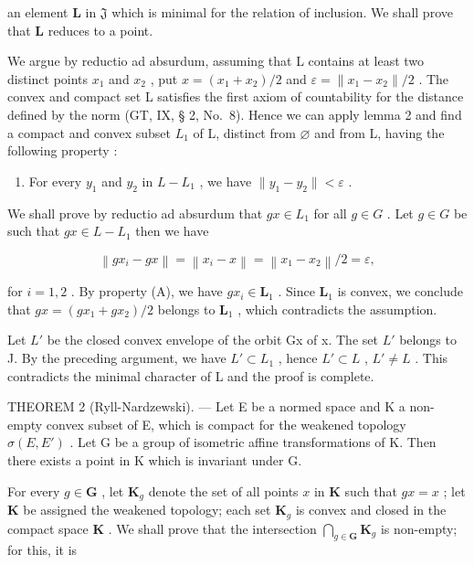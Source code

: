 an element \(\mathbf{L}\) in \(\mathfrak{J}\) which is minimal for the relation of inclusion. We shall prove that \(\mathbf{L}\) reduces to a point.

We argue by reductio ad absurdum, assuming that L contains at least two distinct points \(x_{1}\) and \(x_{2}\) , put \(x = (x_{1} + x_{2})/2\) and \(\varepsilon = \|x_{1} - x_{2}\|/2\) . The convex and compact set L satisfies the first axiom of countability for the distance defined by the norm (GT, IX, § 2, No.~8). Hence we can apply lemma 2 and find a compact and convex subset \(L_{1}\) of L, distinct from \(\varnothing\) and from L, having the following property :

\begin{enumerate}
\def\labelenumi{(\Alph{enumi})}
\tightlist
\item
  For every \(y_{1}\) and \(y_{2}\) in \(L - L_{1}\) , we have \(\|y_{1} - y_{2}\| < \varepsilon\) .
\end{enumerate}

We shall prove by reductio ad absurdum that \(gx \in L_{1}\) for all \(g \in G\) . Let \(g \in G\) be such that \(gx \in L - L_{1}\) then we have

\[
\left\| g x _ {i} - g x \right\| = \left\| x _ {i} - x \right\| = \left\| x _ {1} - x _ {2} \right\| / 2 = \varepsilon ,
\]

for \(i = 1, 2\) . By property (A), we have \(gx_{i} \in \mathbf{L}_{1}\) . Since \(\mathbf{L}_{1}\) is convex, we conclude that \(gx = (gx_{1} + gx_{2}) / 2\) belongs to \(\mathbf{L}_{1}\) , which contradicts the assumption.

Let \(L'\) be the closed convex envelope of the orbit Gx of x. The set \(L'\) belongs to J. By the preceding argument, we have \(L' \subset L_1\) , hence \(L' \subset L\) , \(L' \neq L\) . This contradicts the minimal character of L and the proof is complete.

THEOREM 2 (Ryll-Nardzewski). --- Let E be a normed space and K a non-empty convex subset of E, which is compact for the weakened topology \(\sigma(E, E')\) . Let G be a group of isometric affine transformations of K. Then there exists a point in K which is invariant under G.

For every \(g \in \mathbf{G}\) , let \(\mathbf{K}_g\) denote the set of all points \(x\) in \(\mathbf{K}\) such that \(gx = x\) ; let \(\mathbf{K}\) be assigned the weakened topology; each set \(\mathbf{K}_g\) is convex and closed in the compact space \(\mathbf{K}\) . We shall prove that the intersection \(\bigcap_{g \in \mathbf{G}} \mathbf{K}_g\) is non-empty; for this, it is

